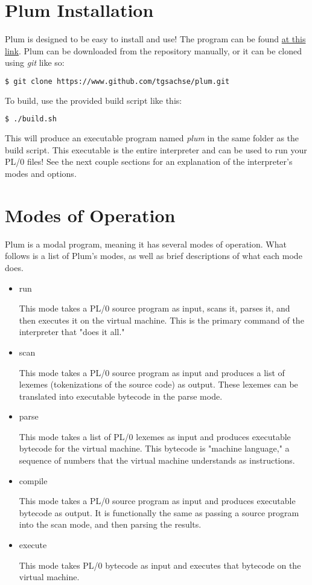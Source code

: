 \documentclass{article}
\begin{document}
\section*{Plum Installation}
Plum is designed to be easy to install and use! The program can be found 
\href{https://www.github.com/tgsachse/plum}{at this link}. Plum can be downloaded from
the repository manually, or it can be cloned using \emph{git} like so:
\begin{lstlisting}[language=bash]
    $ git clone https://www.github.com/tgsachse/plum.git
\end{lstlisting}
To build, use the provided build script like this:
\begin{lstlisting}[language=bash]
    $ ./build.sh
\end{lstlisting}
This will produce an executable program named \emph{plum} in the same folder as
the build script. This executable is the entire interpreter and can be used to run
your PL/0 files! See the next couple sections for an explanation of the interpreter's
modes and options.

\pagebreak

\section*{Modes of Operation}

Plum is a modal program, meaning it has several modes of operation. What follows
is a list of Plum's modes, as well as brief descriptions of what each mode does.
\begin{itemize}
    \item run

        This mode takes a PL/0 source program as input, scans it, parses it, and then
        executes it on the virtual machine. This is the primary command of the interpreter
        that "does it all."

    \item scan

        This mode takes a PL/0 source program as input and produces a list of lexemes
        (tokenizations of the source code) as output. These lexemes can be translated
        into executable bytecode in the parse mode.

    \item parse
        
        This mode takes a list of PL/0 lexemes as input and produces executable bytecode
        for the virtual machine. This bytecode is "machine language," a sequence of numbers
        that the virtual machine understands as instructions.

    \item compile

        This mode takes a PL/0 source program as input and produces executable bytecode
        as output. It is functionally the same as passing a source program into the scan
        mode, and then parsing the results.

    \item execute

        This mode takes PL/0 bytecode as input and executes that bytecode on the virtual
        machine.
\end{itemize}
\end{document}

